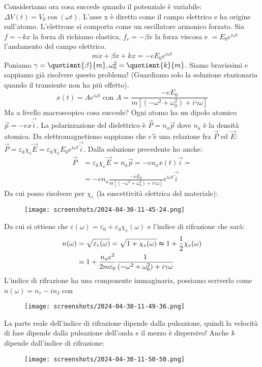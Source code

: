 Consideriamo ora cosa succede quando il potenziale è variabile: \(\Delta V (t) = V_0 \cos (\omega t)\). L'asse x è diretto come il campo elettrico e ha origine sull'atomo. L'elettrone si comporta come un oscillatore armonico forzato. Sia \(f=-kx\) la forza di richiamo elastica, \(f_v = -\beta \dot{x}\) la forza viscosa e \( =E_0 e^{i \omega t}\) l'andamento del campo elettrico.
\begin{equation}
	m \ddot{x} + \beta \dot{x} + kx = - e E_0 e^{i \omega t}
\end{equation}
Poniamo \(\gamma = \quotient{\beta }{m}, \omega _0 ^{2} = \quotient{k}{m} \). Siamo bravissimi e sappiamo già risolvere questo problema! (Guardiamo solo la soluzione stazionaria quando il transiente non ha più effetto).
\begin{equation}
	x(t)= A e^{i \omega t} \text{ con } A= \frac{-e E_0}{m[(- \omega ^{2} + \omega ^{2} _0) + i \gamma \omega ]}
\end{equation}
Ma a livello macroscopico cosa succede? Ogni atomo ha un dipolo atomico \(\vec{p}=-e x \vec{\hat{i}}\). La polarizzazione del dielettrico è \(\vec{P}= n_a \vec{p}\) dove \(n_a\) è la densità atomica. Da elettromagnetismo sappiamo che c'è una relazione fra \(\vec{P}\) ed \(\vec{E}\): \(\vec{P}= \varepsilon _0 \chi _e \vec{E} = \varepsilon _0 \chi _e E_0 e^{i \omega t} \vec{\hat{i}}\). Dalla soluzione precedente ho anche:
\begin{align}
	\vec{P}&= \varepsilon _0 \chi _e \vec{E} = n_a \vec{p} = -e n_a x(t) \vec{i}=\\
	&= - e n_a \frac{- e E_0}{m[(- \omega ^{2} + \omega ^{2} _0) + i \gamma \omega ]}e^{i \omega t} \vec{\hat{i}}
\end{align}
Da cui posso risolvere per \(\chi _e\) (la suscettività elettrica del materiale):
\begin{figure}[H]
	\centering
	\texttt{[image: screenshots/2024-04-30-11-45-24.png]}
\end{figure}
Da cui si ottiene che \(\varepsilon (\omega )= \varepsilon _0 + \varepsilon _0 \chi _e(\omega )\) e l'indice di rifrazione che sarà:
\begin{align}
	n (\omega ) &= \sqrt{\varepsilon _r (\omega )} = \sqrt{1 + \chi _e (\omega )} \thickapprox 1 + \frac{1}{2}\chi _e(\omega )\\
	&= 1 + \frac{n_a e^{2} }{2 m \varepsilon _0} \frac{1}{(-\omega ^{2} + \omega ^{2} _0)+ i \gamma \omega }
\end{align}
L'indice di rifrazione ha una componente immaginaria, possiamo scriverlo come \(n(\omega ) = n_r - i n_I\) con
\begin{figure}[H]
	\centering
	\texttt{[image: screenshots/2024-04-30-11-49-36.png]}
\end{figure}
La parte reale dell'indice di rifrazione dipende dalla pulsazione, quindi la velocità di fase dipende dalla pulsazione dell'onda e il mezzo è dispersivo! Anche \(k\) dipende dall'indice di rifrazione:
\begin{figure}[H]
	\centering
	\texttt{[image: screenshots/2024-04-30-11-50-50.png]}
\end{figure}
